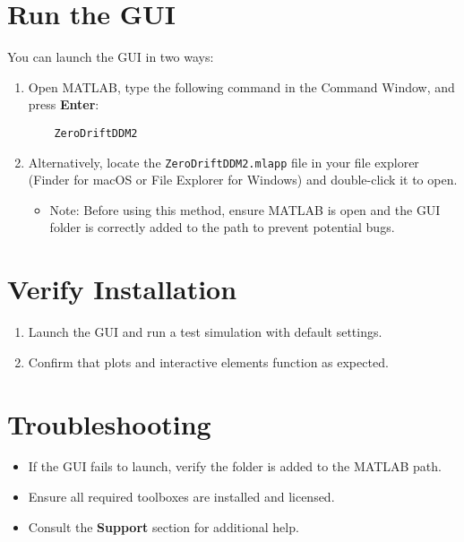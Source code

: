 \section{Run the GUI}
You can launch the GUI in two ways:
\begin{enumerate}
    \item Open MATLAB, type the following command in the Command Window, and press \textbf{Enter}:
    \begin{verbatim}
    ZeroDriftDDM2
    \end{verbatim}
    \item Alternatively, locate the \texttt{ZeroDriftDDM2.mlapp} file in your file explorer (Finder for macOS or File Explorer for Windows) and double-click it to open. 
    \begin{itemize}
        \item Note: Before using this method, ensure MATLAB is open and the GUI folder is correctly added to the path to prevent potential bugs.
    \end{itemize}
\end{enumerate}

\section{Verify Installation}
\begin{enumerate}
    \item Launch the GUI and run a test simulation with default settings.
    \item Confirm that plots and interactive elements function as expected.
\end{enumerate}

\section{Troubleshooting}
\begin{itemize}
    \item If the GUI fails to launch, verify the folder is added to the MATLAB path.
    \item Ensure all required toolboxes are installed and licensed.
    \item Consult the \textbf{Support} section for additional help.
\end{itemize}